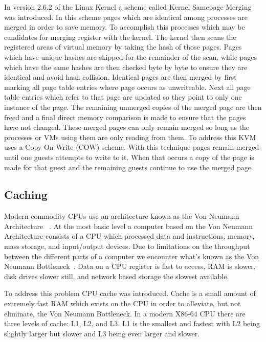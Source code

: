 In version 2.6.2 of the Linux Kernel a scheme called Kernel Samepage Merging ~\cite{arcangeli_increasing_2009} was introduced. In this scheme pages which are identical among processes are merged in order to save memory. To accomplish this processes which may be candidates for merging register with the kernel. The kernel then scans the registered areas of virtual memory by taking the hash of those pages. Pages which have unique hashes are skipped for the remainder of the scan, while pages which have the same hashes are then checked byte by byte to ensure they are identical and avoid hash collision. Identical pages are then merged by first marking all page table entries where page occurs as unwriteable. Next all page table entries which refer to that page are updated so they point to only one instance of the page. The remaining unmerged copies of the merged page are then freed and a final direct memory comparison is made to ensure that the pages have not changed. These merged pages can only remain merged so long as the processes or VMs using them are only reading from them. To address this KVM uses a Copy-On-Write (COW) scheme. With this technique pages remain merged until one guests attempts to write to it. When that occurs a copy of the page is made for that guest and the remaining guests continue to use the merged page. 

\subsection{Caching}

Modern commodity CPUs use an architecture known as the Von Neumann Architecture ~\cite{von_neumann_first_1993}.  At the most basic level a computer based on the Von Neumann Architecture consists of a CPU which processed data and instructions, memory, mass storage, and input/output devices.  Due to limitations on the throughput between the different parts of a computer we encounter what’s known as the Von Neumann Bottleneck~\cite{von_neumann_first_1993}.  Data on a CPU register is fast to access, RAM is slower, disk drives slower still, and network based storage the slowest available. 

To address this problem CPU cache was introduced. Cache is a small amount of extremely fast RAM which exists on the CPU in order to alleviate, but not eliminate, the Von Neumann Bottleneck.    In a modern X86-64 CPU there are three levels of cache: L1, L2, and L3. L1 is the smallest and fastest with L2 being slightly larger but slower and L3 being even larger and slower. 

